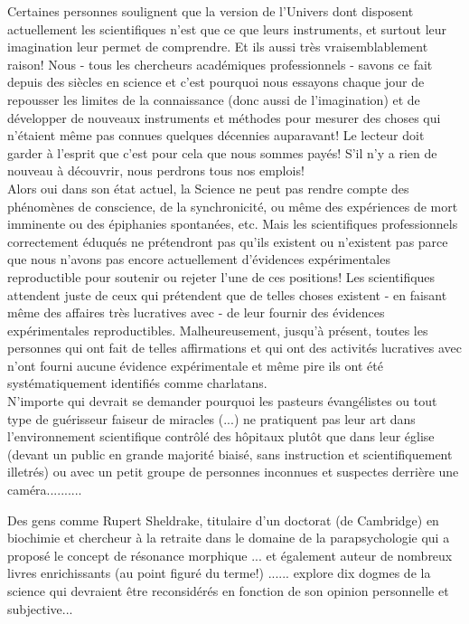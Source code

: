 	\begin{tcolorbox}[title=Remarque,colframe=black,arc=10pt]
	Certaines personnes soulignent que la version de l'Univers dont disposent actuellement les scientifiques n'est que ce que leurs instruments, et surtout leur imagination leur permet de comprendre. Et ils aussi très vraisemblablement raison! Nous - tous les chercheurs académiques professionnels - savons ce fait depuis des siècles en science et c'est pourquoi nous essayons chaque jour de repousser les limites de la connaissance (donc aussi de l'imagination) et de développer de nouveaux instruments et méthodes pour mesurer des choses qui n'étaient même pas connues quelques décennies auparavant! Le lecteur doit garder à l'esprit que c'est pour cela que nous sommes payés! S'il n'y a rien de nouveau à découvrir, nous perdrons tous nos emplois!\\
	
	Alors oui dans son état actuel, la Science ne peut pas rendre compte des phénomènes de conscience, de la synchronicité, ou même des expériences de mort imminente ou des épiphanies spontanées, etc. Mais les scientifiques professionnels correctement éduqués ne prétendront pas qu'ils existent ou n'existent pas parce que nous n'avons pas encore actuellement d'évidences expérimentales reproductible pour soutenir ou rejeter l'une de ces positions! Les scientifiques attendent juste de ceux qui prétendent que de telles choses existent - en faisant même des affaires très lucratives avec - de leur fournir des évidences expérimentales reproductibles. Malheureusement, jusqu'à présent, toutes les personnes qui ont fait de telles affirmations et qui ont des activités lucratives avec n'ont fourni aucune évidence expérimentale et même pire ils ont été systématiquement identifiés comme charlatans.\\
	
	N'importe qui devrait se demander pourquoi les pasteurs évangélistes ou tout type de guérisseur faiseur de miracles (...) ne pratiquent pas leur art dans l'environnement scientifique contrôlé des hôpitaux plutôt que dans leur église (devant un public en grande majorité biaisé, sans instruction et scientifiquement illetrés) ou avec un petit groupe de personnes inconnues et suspectes derrière une caméra..........
	\end{tcolorbox}
	 
	Des gens comme Rupert Sheldrake, titulaire d'un doctorat (de Cambridge) en biochimie et chercheur à la retraite dans le domaine de la parapsychologie qui a proposé le concept de résonance morphique ... et également auteur de nombreux livres enrichissants (au point figuré du terme!) ...... explore dix dogmes de la science qui devraient être reconsidérés en fonction de son opinion personnelle et subjective...
	
